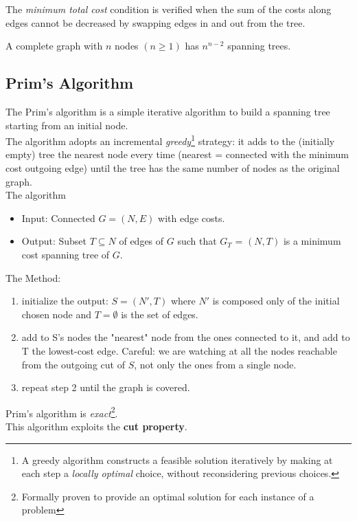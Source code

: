         The \emph{minimum total cost} condition is verified when the sum of the costs along edges cannot be decreased by swapping edges in and out from the tree.
        
        \begin{theorem}[Cayley, 1889]
            A complete graph with $n$ nodes $(n \geq 1)$ has $n^{n-2}$ spanning trees.
        \end{theorem}
       

        \subsection{Prim's Algorithm}
            The Prim's algorithm is a simple iterative algorithm to build a spanning tree starting from an initial node.\\
            The algorithm adopts an incremental \emph{greedy}\footnote{A greedy algorithm constructs a feasible solution iteratively by
            making at each step a \emph{locally optimal} choice, without reconsidering previous choices.}
            strategy: it adds to the (initially empty) tree the nearest node every time (nearest = connected with the minimum cost outgoing edge) until the tree has the same number of nodes as the original graph.\\
            The algorithm
            \begin{itemize}
                \item Input: Connected $G = (N, E)$ with edge costs.
                \item Output: Subset $T \subseteq N$ of edges of $G$ such that $G_T$ = $(N, T)$ is a minimum cost spanning tree of $G$.
            \end{itemize}
            The Method:
            \begin{enumerate}
                \item initialize the output: $S = (N', T)$ where $N'$ is composed only of the initial chosen node and $T = \emptyset$ is the set of edges.
                \item add to S's nodes the "nearest" node from the ones connected to it, and add to T the lowest-cost edge. Careful: we are watching at \emph{}{all the nodes reachable from the outgoing cut of $S$}, not only the ones from a single node.
                \item repeat step 2 until the graph is covered.
            \end{enumerate}
            Prim's algorithm is \emph{exact}\footnote{Formally proven to provide an optimal solution for each instance of a problem}.\\
            This algorithm exploits the \textbf{cut property}.

